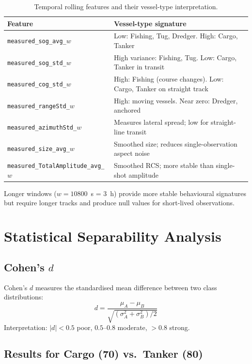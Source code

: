 \documentclass[journal]{IEEEtran}
\begin{document}
\begin{table}[H]
\centering
\caption{Temporal rolling features and their vessel-type interpretation.}
\begin{tabular}{p{5cm}p{8.5cm}}
\toprule
\textbf{Feature} & \textbf{Vessel-type signature} \\
\midrule
\texttt{measured\_sog\_avg\_}$w$ & Low: Fishing, Tug, Dredger. High: Cargo, Tanker \\
\texttt{measured\_sog\_std\_}$w$ & High variance: Fishing, Tug. Low: Cargo, Tanker in transit \\
\texttt{measured\_cog\_std\_}$w$ & High: Fishing (course changes). Low: Cargo, Tanker on straight track \\
\texttt{measured\_rangeStd\_}$w$ & High: moving vessels. Near zero: Dredger, anchored \\
\texttt{measured\_azimuthStd\_}$w$ & Measures lateral spread; low for straight-line transit \\
\texttt{measured\_size\_avg\_}$w$ & Smoothed size; reduces single-observation aspect noise \\
\texttt{measured\_TotalAmplitude\_avg\_}$w$ & Smoothed RCS; more stable than single-shot amplitude \\
\bottomrule
\end{tabular}
\end{table}

Longer windows ($w=10800$~s = 3~h) provide more stable behavioural signatures
but require longer tracks and produce null values for short-lived observations.

\section{Statistical Separability Analysis}
\label{sec:separability}

\subsection{Cohen's $d$}

Cohen's $d$ measures the standardised mean difference between two class
distributions:
\begin{equation}
  d = \frac{\mu_A - \mu_B}{\sqrt{(\sigma_A^2 + \sigma_B^2)/2}}
\end{equation}
Interpretation: $|d| < 0.5$ poor, $0.5$--$0.8$ moderate, $>0.8$ strong.

\subsection{Results for Cargo (70) vs.\ Tanker (80)}
\end{document}
